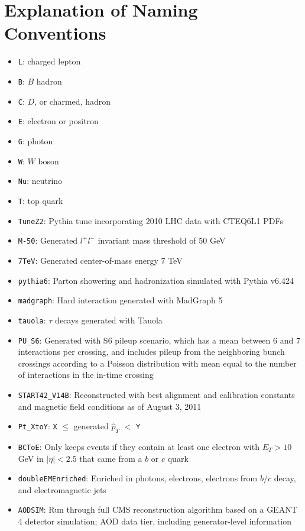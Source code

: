 \documentclass[dissertation.tex]{subfiles}
\begin{document}
\section{Explanation of Naming Conventions}
\label{sec:Explanation of Naming Conventions}

\begin{itemize}
\item \verb+L+: charged lepton
\item \verb+B+: $B$ hadron
\item \verb+C+: $D$, or charmed, hadron
\item \verb+E+: electron or positron
\item \verb+G+: photon
\item \verb+W+: $W$ boson
\item \verb+Nu+: neutrino
\item \verb+T+: top quark
\item \verb+TuneZ2+: Pythia tune incorporating 2010 LHC data with CTEQ6L1 \cite{PhysRevD.78.013004} PDFs \cite{LPCC_MBUE_WG}
\item \verb+M-50+: Generated $l^{+}l^{-}$ invariant mass threshold of 50 GeV
\item \verb+7TeV+: Generated center-of-mass energy 7 TeV
\item \verb+pythia6+: Parton showering and hadronization simulated with Pythia v6.424 \cite{1126-6708-2006-05-026}
\item \verb+madgraph+: Hard interaction generated with MadGraph 5 \cite{springerlink:10.1007/JHEP06(2011)128}
\item \verb+tauola+: $\tau$ decays generated with Tauola \cite{Was200196}
\item \verb+PU_S6+: Generated with S6 pileup scenario, which has a mean between 6 and 7 interactions per crossing, and includes pileup from the neighboring bunch crossings according to a Poisson distribution with mean equal to the number of interactions in the in-time crossing \cite{PUS6}
\item \verb+START42_V14B+: Reconstructed with best alignment and calibration constants and magnetic field conditions as of August 3, 2011
\item \verb+Pt_XtoY+: \verb+X+ $\leq$ generated $\hat{p}_{T}$ $<$ \verb+Y+
\item \verb+BCToE+: Only keeps events if they contain at least one electron with $E_{T} > 10$ GeV in $|\eta| < 2.5$ that came from a $b$ or $c$ quark
\item \verb+doubleEMEnriched+: Enriched in photons, electrons, electrons from $b/c$ decay, and electromagnetic jets \cite{doubleEMEnriched_filter_cfg}
\item \verb+AODSIM+: Run through full CMS reconstruction algorithm based on a GEANT 4 \cite{1610988} detector simulation; AOD data tier, including generator-level information
\end{itemize}
\end{document}
